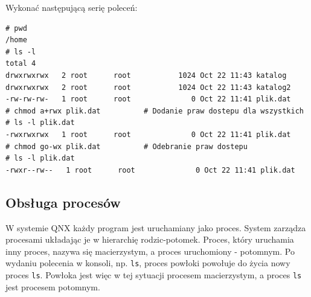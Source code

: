 \begin{example}
Wykonać następującą serię poleceń:

\begin{lstlisting}[style=MyBashStyle]
# pwd
/home
# ls -l
total 4
drwxrwxrwx   2 root      root           1024 Oct 22 11:43 katalog
drwxrwxrwx   2 root      root           1024 Oct 22 11:43 katalog2
-rw-rw-rw-   1 root      root              0 Oct 22 11:41 plik.dat
# chmod a+rwx plik.dat			# Dodanie praw dostepu dla wszystkich
# ls -l plik.dat
-rwxrwxrwx   1 root      root              0 Oct 22 11:41 plik.dat
# chmod go-wx plik.dat			# Odebranie praw dostepu
# ls -l plik.dat
-rwxr--rw--   1 root      root              0 Oct 22 11:41 plik.dat
\end{lstlisting}



\end{example}


\subsection{Obsługa procesów}

W systemie QNX każdy program jest uruchamiany jako proces. System zarządza procesami układając je w hierarchię rodzic-potomek. Proces, który uruchamia inny proces, nazywa się macierzystym, a proces uruchomiony - potomnym. Po wydaniu polecenia w konsoli, np. \lstinline[style=MyBashStyle]{ls}, proces powłoki powołuje do życia nowy proces \lstinline[style=MyBashStyle]{ls}. Powłoka jest więc w tej sytuacji procesem macierzystym, a proces \lstinline[style=MyBashStyle]{ls} jest procesem potomnym.


